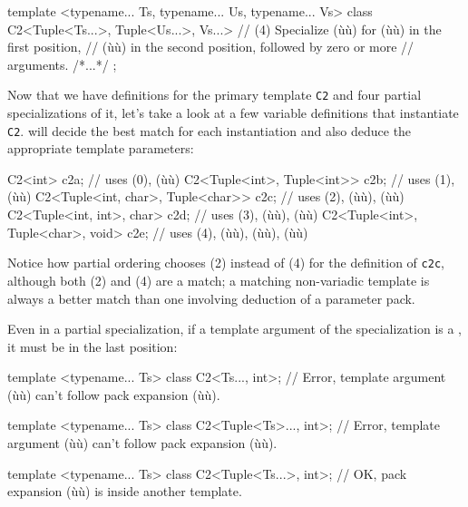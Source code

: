 \begin{emcppslisting}[emcppsbatch=e10]
template <typename... Ts, typename... Us, typename... Vs>
class C2<Tuple<Ts...>, Tuple<Us...>, Vs...>
    // (4) Specialize (ù{}ù) for (ù{}ù) in the first position,
    // (ù{}ù) in the second position, followed by zero or more
    // arguments.
{ /*...*/ };
\end{emcppslisting}
    

\noindent Now that we have definitions for the primary template \lstinline!C2! and
four partial specializations of it, let's take a look at a few variable
definitions that instantiate \lstinline!C2!.  will decide the
best match for each instantiation and also deduce the appropriate
template parameters:

\begin{emcppslisting}[emcppsbatch=e10]
C2<int>                           c2a;  // uses (0), (ù{}ù)
C2<Tuple<int>, Tuple<int>>        c2b;  // uses (1), (ù{}ù)
C2<Tuple<int, char>, Tuple<char>> c2c;  // uses (2), (ù{}ù), (ù{}ù)
C2<Tuple<int, int>, char>         c2d;  // uses (3), (ù{}ù), (ù{}ù)
C2<Tuple<int>, Tuple<char>, void> c2e;  // uses (4), (ù{}ù), (ù{}ù), (ù{}ù)
\end{emcppslisting}
    

\noindent Notice how partial ordering chooses (2) instead of (4) for the
definition of \lstinline!c2c!, although both (2) and (4) are a match; a
matching non-variadic template is always a better match than one
involving deduction of a parameter pack.

Even in a partial specialization, if a template argument of the
specialization is a , it must be in the last
position:

\begin{emcppslisting}[emcppsbatch=e10,emcppserrorlines={1,2,5,6}]
template <typename... Ts>
class C2<Ts..., int>;
    // Error, template argument (ù{}ù) can't follow pack expansion (ù{}ù).

template <typename... Ts>
class C2<Tuple<Ts>..., int>;
    // Error, template argument (ù{}ù) can't follow pack expansion (ù{}ù).

template <typename... Ts>
class C2<Tuple<Ts...>, int>;
    // OK, pack expansion (ù{}ù) is inside another template.
\end{emcppslisting}
    

